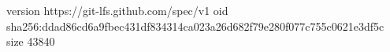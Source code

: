 version https://git-lfs.github.com/spec/v1
oid sha256:ddad86cd6a9fbec431df834314ca023a26d682f79e280f077c755c0621e3df5c
size 43840
